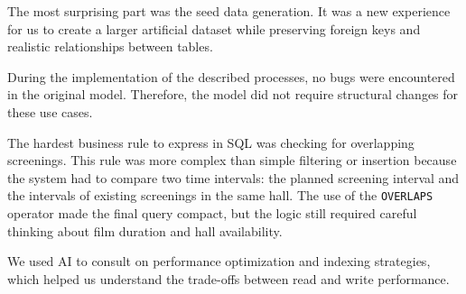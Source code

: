 \documentclass[11pt, a4paper]{article}
\begin{document}
The most surprising part was the seed data generation.
It was a new experience for us to create a larger artificial dataset while preserving foreign keys and realistic relationships between tables.

During the implementation of the described processes, no bugs were encountered in the original model.
Therefore, the model did not require structural changes for these use cases.

The hardest business rule to express in SQL was checking for overlapping screenings.
This rule was more complex than simple filtering or insertion because the system had to compare two time intervals:
the planned screening interval and the intervals of existing screenings in the same hall.
The use of the \texttt{OVERLAPS} operator made the final query compact, but the logic still required careful thinking about film duration and hall availability.

We used AI to consult on performance optimization and indexing strategies, which helped us understand the trade-offs between read and write performance.
\end{document}
